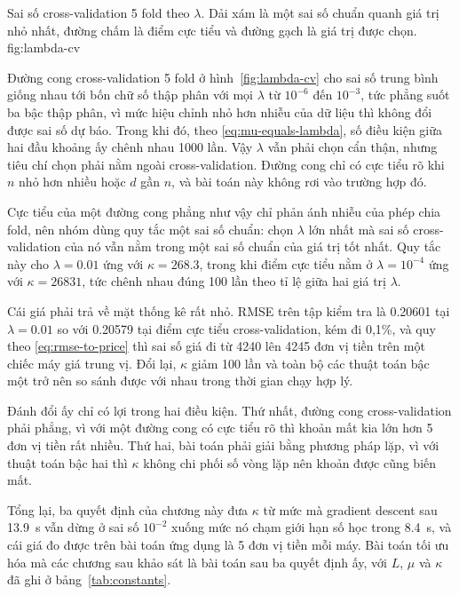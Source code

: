   {Sai số cross-validation 5 fold theo $\lambda$. Dải xám là một sai số chuẩn
   quanh giá trị nhỏ nhất, đường chấm là điểm cực tiểu và đường gạch là giá trị
   được chọn.}
  {fig:lambda-cv}

Đường cong cross-validation 5 fold ở hình~\ref{fig:lambda-cv} cho sai số trung
bình giống nhau tới bốn chữ số thập phân với mọi $\lambda$ từ $10^{-6}$ đến
$10^{-3}$, tức phẳng suốt ba bậc thập phân, vì mức hiệu chỉnh nhỏ hơn nhiễu của
dữ liệu thì không đổi được sai số dự báo. Trong khi đó, theo
\eqref{eq:mu-equals-lambda}, số điều kiện giữa hai đầu khoảng ấy chênh nhau
1000 lần. Vậy $\lambda$ vẫn phải chọn cẩn thận, nhưng tiêu chí chọn phải nằm
ngoài cross-validation. Đường cong chỉ có cực tiểu rõ khi $n$ nhỏ hơn nhiều
hoặc $d$ gần $n$, và bài toán này không rơi vào trường hợp đó.

Cực tiểu của một đường cong phẳng như vậy chỉ phản ánh nhiễu của phép chia
fold, nên nhóm dùng quy tắc một sai số chuẩn: chọn $\lambda$ lớn nhất mà sai số
cross-validation của nó vẫn nằm trong một sai số chuẩn của giá trị tốt nhất.
Quy tắc này cho $\lambda = \num{0.01}$ ứng với $\kappa = \num{268.3}$, trong
khi điểm cực tiểu nằm ở $\lambda = 10^{-4}$ ứng với $\kappa = \num{26831}$, tức
chênh nhau đúng 100 lần theo tỉ lệ giữa hai giá trị $\lambda$.

Cái giá phải trả về mặt thống kê rất nhỏ. RMSE trên tập kiểm tra là
\num{0.20601} tại $\lambda = \num{0.01}$ so với \num{0.20579} tại điểm cực tiểu
cross-validation, kém đi 0{,}1\%, và quy theo \eqref{eq:rmse-to-price} thì sai
số giá đi từ \num{4240} lên \num{4245} đơn vị tiền trên một chiếc máy giá trung
vị. Đổi lại, $\kappa$ giảm 100 lần và toàn bộ các thuật toán bậc một trở nên so
sánh được với nhau trong thời gian chạy hợp lý.

Đánh đổi ấy chỉ có lợi trong hai điều kiện. Thứ nhất, đường cong
cross-validation phải phẳng, vì với một đường cong có cực tiểu rõ thì khoản mất
kia lớn hơn 5 đơn vị tiền rất nhiều. Thứ hai, bài toán phải giải bằng phương
pháp lặp, vì với thuật toán bậc hai thì $\kappa$ không chi phối số vòng lặp nên
khoản được cũng biến mất.

Tổng lại, ba quyết định của chương này đưa $\kappa$ từ mức mà gradient descent
sau \SI{13.9}{\second} vẫn dừng ở sai số $10^{-2}$ xuống mức nó chạm giới hạn số
học trong \SI{8.4}{\second}, và cái giá đo được trên bài toán ứng dụng là 5 đơn
vị tiền mỗi máy. Bài toán tối ưu hóa mà các chương sau khảo sát là bài toán sau ba quyết
định ấy, với $L$, $\mu$ và $\kappa$ đã ghi ở bảng~\ref{tab:constants}.
